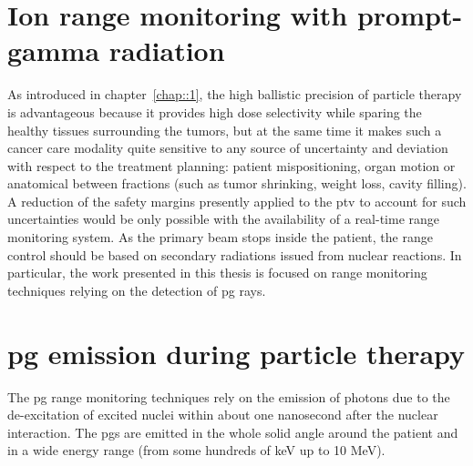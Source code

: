 \section{Ion range monitoring with prompt-gamma radiation}

As introduced in chapter~\ref{chap::1}, the high ballistic precision of particle therapy is advantageous because it provides high dose selectivity while sparing the healthy tissues surrounding the tumors, but at the same time it makes such a cancer care modality quite sensitive to any source of uncertainty and deviation with respect to the treatment planning: patient mispositioning, organ motion or anatomical between fractions (such as tumor shrinking, weight loss, cavity filling). A reduction of the safety margins presently applied to the \gls{ptv} to account for such uncertainties would be only possible with the availability of a real-time range monitoring system. As the primary beam stops inside the patient, the range control should be based on secondary radiations issued from nuclear reactions. In particular, the work presented in this thesis is focused on range monitoring techniques relying on the detection of \gls{pg} rays.
 
\section{\gls{pg} emission during particle therapy}

The \gls{pg} range monitoring techniques rely on the emission of photons due to the de-excitation of excited nuclei within about one nanosecond after the nuclear interaction. The \glspl{pg} are emitted in the whole solid angle around the patient and in a wide energy range (from some hundreds of keV up to 10 MeV). 

